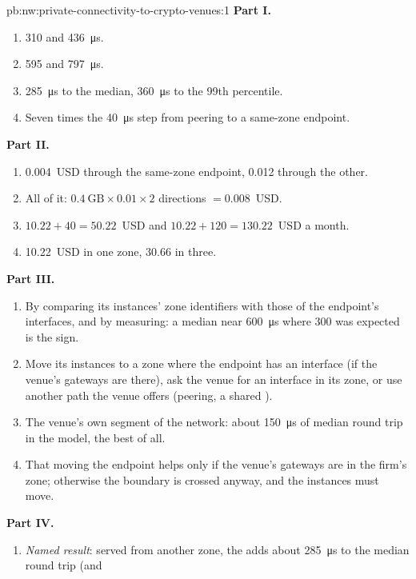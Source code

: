 \begin{solution}{pb:nw:private-connectivity-to-crypto-venues:1}
\textbf{Part I.}
\begin{enumerate}
\item 310 and \qty{436}{\micro\second}.
\item 595 and \qty{797}{\micro\second}.
\item \qty{285}{\micro\second} to the median, \qty{360}{\micro\second} to the 99th percentile.
\item Seven times the \qty{40}{\micro\second} step from peering to a same-zone endpoint.
\end{enumerate}
\textbf{Part II.}
\begin{enumerate}[resume]
\item 0.004~USD through the same-zone endpoint, 0.012 through the other.
\item All of it: $0.4~\mathrm{GB} \times 0.01 \times 2$ directions $= 0.008$~USD.
\item $10.22 + 40 = 50.22$~USD and $10.22 + 120 = 130.22$~USD a month.
\item 10.22~USD in one zone, 30.66 in three.
\end{enumerate}
\textbf{Part III.}
\begin{enumerate}[resume]
\item By comparing its instances' zone identifiers with those of the endpoint's interfaces, and by measuring: a median near \qty{600}{\micro\second}
  where 300 was expected is the sign.
\item Move its instances to a zone where the endpoint has an interface (if the venue's gateways are there), ask the venue for an interface in its
  zone, or use another path the venue offers (peering, a shared ).
\item The venue's own segment of the network: about \qty{150}{\micro\second} of median round trip in the model, the best of all.
\item That moving the endpoint helps only if the venue's gateways are in the firm's zone; otherwise the boundary is crossed anyway, and the instances
  must move.
\end{enumerate}
\textbf{Part IV.}
\begin{enumerate}[resume]
\item \emph{Named result}: served from another zone, the  adds about \qty{285}{\micro\second} to the median round trip (and

\end{enumerate}
\end{solution}
